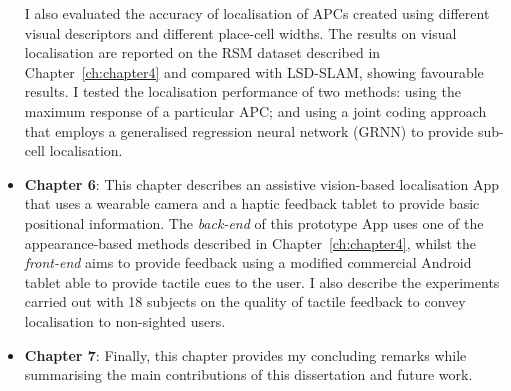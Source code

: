 \begin{itemize}
I also evaluated the accuracy of localisation of APCs created using different visual descriptors and different place\--cell widths. The results on visual localisation are reported on the RSM dataset described in Chapter~\ref{ch:chapter4} and compared with LSD-SLAM, showing favourable results. I tested the localisation performance of two methods: using the maximum response of a particular APC; and using a joint coding approach that employs a generalised regression neural network (GRNN) to provide sub-cell localisation.

\item \textbf{Chapter 6}: This chapter describes an assistive vision-based localisation App that uses a wearable camera and a haptic feedback tablet to provide basic positional information. The \textit{back-end} of this prototype App uses one of the appearance-based methods described in Chapter~\ref{ch:chapter4}, whilst the \textit{front-end} aims to provide feedback using a modified commercial Android tablet able to provide tactile cues to the user. I also describe the experiments carried out with 18 subjects on the quality of tactile feedback to convey localisation to non-sighted users.

\item \textbf{Chapter 7}: Finally, this chapter provides my concluding remarks while summarising the main contributions of this dissertation and future work.

\end{itemize}